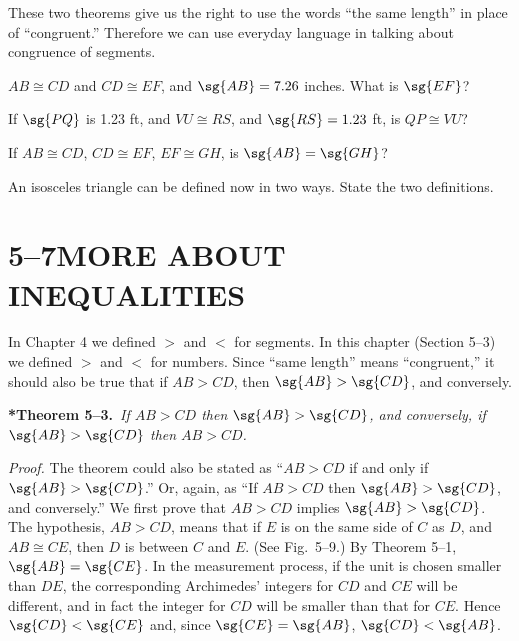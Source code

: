 \documentclass[11pt]{book}
\theoremstyle{bkplain}
\theoremstyle{XIplainnote}
\theoremstyle{bkplain}
\theoremstyle{bkplain}
\begin{document}
\FIGVEIGHT

These two theorems give us the right to use the words ``the same length'' in
place of ``congruent.'' Therefore we can use everyday language in talking about
congruence of segments.


\begin{exercisecols}
\begin{exlist}
\item $AB \cong CD$ and $CD \cong EF$, and $\sg{AB} = 7.26$ inches. What is
      $\sg{EF}$?
\item If $\sg{PQ}$ is 1.23 ft, and $VU \cong RS$, and $\sg{RS} = 1.23$ ft, is
      $QP \cong VU$?
\item If $AB \cong CD$, $CD \cong EF$, $EF \cong GH$, is $\sg{AB} = \sg{GH}$?
\item An isosceles triangle can be defined now in two ways. State the two
      definitions.
\end{exlist}
\end{exercisecols}

\section*{5--7\quad MORE ABOUT INEQUALITIES}

In Chapter 4 we defined $>$ and $<$ for segments. In this chapter (Section
5--3) we defined $>$ and $<$ for numbers. Since ``same length'' means
``congruent,'' it should also be true that if $AB > CD$, then
$\sg{AB} > \sg{CD}$, and conversely.

\medskip\noindent
\textbf{*Theorem 5--3.}\ \emph{If $AB > CD$ then $\sg{AB} > \sg{CD}$, and
conversely, if $\sg{AB} > \sg{CD}$ then $AB > CD$.}
\par\medskip

\noindent\emph{Proof.} The theorem could also be stated as ``$AB > CD$ if and
only if $\sg{AB} > \sg{CD}$.'' Or, again, as ``If $AB > CD$ then
$\sg{AB} > \sg{CD}$, and conversely.'' We first prove that $AB > CD$ implies
$\sg{AB} > \sg{CD}$. The hypothesis, $AB > CD$, means that if $E$ is on the
same side of $C$ as $D$, and $AB \cong CE$, then $D$ is between $C$ and $E$.
(See Fig.~5--9.) By Theorem 5--1, $\sg{AB} = \sg{CE}$. In the measurement
process, if the unit is chosen smaller than $DE$, the corresponding Archimedes'
integers for $CD$ and $CE$ will be different, and in fact the integer for $CD$
will be smaller than that for $CE$. Hence $\sg{CD} < \sg{CE}$ and, since
$\sg{CE} = \sg{AB}$, $\sg{CD} < \sg{AB}$.
\end{document}
